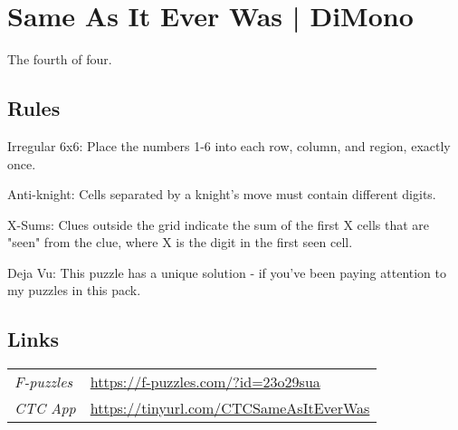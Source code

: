 \section[Same As It Ever Was | DiMono {[\emph{6\emph{x}6 Irregular Anti-Knight X-Sums + Deja Vu}]}]{Same As It Ever Was | {\normalfont DiMono}}
\label{sec:09-same-as-it-ever-was-dimono}
The fourth of four.
\subsection*{Rules}
\begin{markdown}
Irregular 6x6: Place the numbers 1-6 into each row, column, and region, exactly once.



Anti-knight: Cells separated by a knight's move must contain different digits.



X-Sums: Clues outside the grid indicate the sum of the first X cells that are "seen" from the clue, where X is the digit in the first seen cell.



Deja Vu: This puzzle has a unique solution - if you've been paying attention to my puzzles in this pack.
\end{markdown}
\subsection*{Links}
\begin{tabularx}{\textwidth}{l X}
\emph{F-puzzles} & \url{https://f-puzzles.com/?id=23o29sua} \\
\emph{CTC App} & \url{https://tinyurl.com/CTCSameAsItEverWas} \\
\end{tabularx}
\pagebreak
